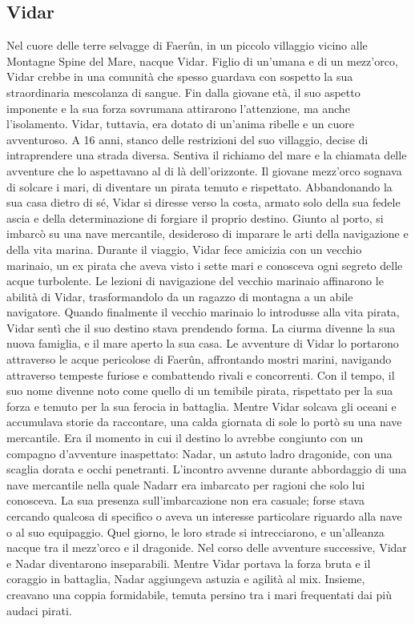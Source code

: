 \documentclass{article}
\begin{document}
          \subsection{Vidar}Nel cuore delle terre selvagge di Faerûn, in un piccolo villaggio vicino alle Montagne Spine del Mare, nacque Vidar. Figlio di un'umana e di un mezz'orco, Vidar crebbe in una comunità che spesso guardava con sospetto la sua straordinaria mescolanza di sangue. Fin dalla giovane età, il suo aspetto imponente e la sua forza sovrumana attirarono l'attenzione, ma anche l'isolamento. Vidar, tuttavia, era dotato di un'anima ribelle e un cuore avventuroso. A 16 anni, stanco delle restrizioni del suo villaggio, decise di intraprendere una strada diversa. Sentiva il richiamo del mare e la chiamata delle avventure che lo aspettavano al di là dell'orizzonte. Il giovane mezz'orco sognava di solcare i mari, di diventare un pirata temuto e rispettato. Abbandonando la sua casa dietro di sé, Vidar si diresse verso la costa, armato solo della sua fedele ascia e della determinazione di forgiare il proprio destino. Giunto al porto, si imbarcò su una nave mercantile, desideroso di imparare le arti della navigazione e della vita marina. Durante il viaggio, Vidar fece amicizia con un vecchio marinaio, un ex pirata che aveva visto i sette mari e conosceva ogni segreto delle acque turbolente. Le lezioni di navigazione del vecchio marinaio affinarono le abilità di Vidar, trasformandolo da un ragazzo di montagna a un abile navigatore. Quando finalmente il vecchio marinaio lo introdusse alla vita pirata, Vidar sentì che il suo destino stava prendendo forma. La ciurma divenne la sua nuova famiglia, e il mare aperto la sua casa. Le avventure di Vidar lo portarono attraverso le acque pericolose di Faerûn, affrontando mostri marini, navigando attraverso tempeste furiose e combattendo rivali e concorrenti. Con il tempo, il suo nome divenne noto come quello di un temibile pirata, rispettato per la sua forza e temuto per la sua ferocia in battaglia. Mentre Vidar solcava gli oceani e accumulava storie da raccontare, una calda giornata di sole lo portò su una nave mercantile. Era il momento in cui il destino lo avrebbe congiunto con un compagno d'avventure inaspettato: Nadar, un astuto ladro dragonide, con una scaglia dorata e occhi penetranti.  L'incontro avvenne durante abbordaggio di una nave mercantile nella quale Nadarr era imbarcato per ragioni che solo lui conosceva. La sua presenza sull'imbarcazione non era casuale; forse stava cercando qualcosa di specifico o aveva un interesse particolare riguardo alla nave o al suo equipaggio. Quel giorno, le loro strade si intrecciarono, e un'alleanza nacque tra il mezz'orco e il dragonide. Nel corso delle avventure successive, Vidar e Nadar diventarono inseparabili. Mentre Vidar portava la forza bruta e il coraggio in battaglia, Nadar aggiungeva astuzia e agilità al mix. Insieme, creavano una coppia formidabile, temuta persino tra i mari frequentati dai più audaci pirati.
\end{document}
